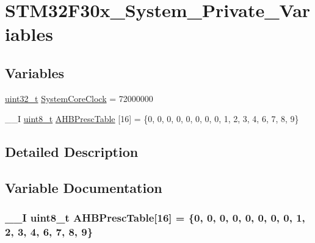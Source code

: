 \hypertarget{group___s_t_m32_f30x___system___private___variables}{\section{S\-T\-M32\-F30x\-\_\-\-System\-\_\-\-Private\-\_\-\-Variables}
\label{group___s_t_m32_f30x___system___private___variables}
}
\subsection*{Variables}
\begin{DoxyCompactItemize}
\item 
\hyperlink{stdint_8h_a435d1572bf3f880d55459d9805097f62}{uint32\-\_\-t} \hyperlink{group___s_t_m32_f30x___system___private___variables_gaa3cd3e43291e81e795d642b79b6088e6}{System\-Core\-Clock} = 72000000
\item 
\-\_\-\-\_\-\-I \hyperlink{stdint_8h_aba7bc1797add20fe3efdf37ced1182c5}{uint8\-\_\-t} \hyperlink{group___s_t_m32_f30x___system___private___variables_gacdc3ef54c0704c90e69a8a84fb2d970d}{A\-H\-B\-Presc\-Table} \mbox{[}16\mbox{]} = \{0, 0, 0, 0, 0, 0, 0, 0, 1, 2, 3, 4, 6, 7, 8, 9\}
\end{DoxyCompactItemize}


\subsection{Detailed Description}


\subsection{Variable Documentation}
\hypertarget{group___s_t_m32_f30x___system___private___variables_gacdc3ef54c0704c90e69a8a84fb2d970d}{
\subsubsection[{A\-H\-B\-Presc\-Table}]{\setlength{\rightskip}{0pt plus 5cm}\-\_\-\-\_\-\-I {\bf uint8\-\_\-t} A\-H\-B\-Presc\-Table\mbox{[}16\mbox{]} = \{0, 0, 0, 0, 0, 0, 0, 0, 1, 2, 3, 4, 6, 7, 8, 9\}}}\label{group___s_t_m32_f30x___system___private___variables_gacdc3ef54c0704c90e69a8a84fb2d970d}


